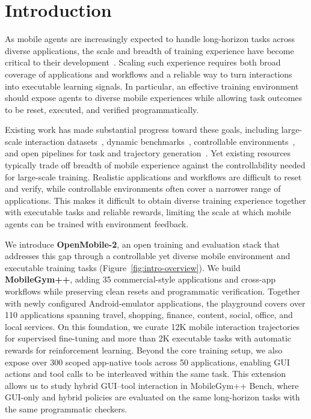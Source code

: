 \section{Introduction}
\label{sec:intro}

As mobile agents are increasingly expected to handle long-horizon tasks across diverse applications, the scale and breadth of training experience have become critical to their development~\citep{yang2023appagent,wang2024mobileagent,cheng2024seeclick,hong2024cogagent,qin2025uitars,liu2024autoglm,wu2025osatlas}. Scaling such experience requires both broad coverage of applications and workflows and a reliable way to turn interactions into executable learning signals. In particular, an effective training environment should expose agents to diverse mobile experiences while allowing task outcomes to be reset, executed, and verified programmatically.

Existing work has made substantial progress toward these goals, including large-scale interaction datasets~\citep{rawles2023aitw,li2024androidcontrol}, dynamic benchmarks~\citep{rawles2025androidworld,xu2025androidlab,chen2024spabench,kong2025mobileworld}, controllable environments~\citep{wu2026mobilegym}, and open pipelines for task and trajectory generation~\citep{cheng2026openmobile}. Yet existing resources typically trade off breadth of mobile experience against the controllability needed for large-scale training. Realistic applications and workflows are difficult to reset and verify, while controllable environments often cover a narrower range of applications. This makes it difficult to obtain diverse training experience together with executable tasks and reliable rewards, limiting the scale at which mobile agents can be trained with environment feedback.

We introduce \textbf{OpenMobile-2}, an open training and evaluation stack that addresses this gap through a controllable yet diverse mobile environment and executable training tasks (Figure~\ref{fig:intro-overview}). We build \textbf{MobileGym++}, adding 35 commercial-style applications and cross-app workflows while preserving clean resets and programmatic verification. Together with newly configured Android-emulator applications, the playground covers over 110 applications spanning travel, shopping, finance, content, social, office, and local services. On this foundation, we curate 12K mobile interaction trajectories for supervised fine-tuning and more than 2K executable tasks with automatic rewards for reinforcement learning. Beyond the core training setup, we also expose over 300 scoped app-native tools across 50 applications, enabling GUI actions and tool calls to be interleaved within the same task. This extension allows us to study hybrid GUI--tool interaction in MobileGym++ Bench, where GUI-only and hybrid policies are evaluated on the same long-horizon tasks with the same programmatic checkers.

